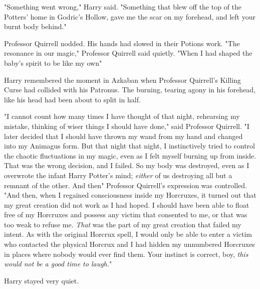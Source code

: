 "Something went wrong," Harry said. "Something that blew off the top of the
Potters' home in Godric's Hollow, gave me the scar on my forehead, and left
your burnt body behind."

Professor Quirrell nodded. His hands had slowed in their Potions work. "The
resonance in our magic," Professor Quirrell said quietly. "When I had shaped
the baby's spirit to be like my own{\el}"

Harry remembered the moment in Azkaban when Professor Quirrell's Killing Curse
had collided with his Patronus. The burning, tearing agony in his forehead,
like his head had been about to split in half.

"I cannot count how many times I have thought of that night, rehearsing my
mistake, thinking of wiser things I should have done," said Professor Quirrell.
"I later decided that I should have thrown my wand from my hand and changed
into my Animagus form. But that night{\el} that night, I instinctively tried
to control the chaotic fluctuations in my magic, even as I felt myself burning
up from inside. That was the wrong decision, and I failed. So my body was
destroyed, even as I overwrote the infant Harry Potter's mind; \emph{either} of
us destroying all but a remnant of the other. And then{\el}" Professor
Quirrell's expression was controlled. "And then, when I regained consciousness
inside my Horcruxes, it turned out that my great creation did not work as I had
hoped. I should have been able to float free of my Horcruxes and possess any
victim that consented to me, or that was too weak to refuse me. \emph{That} was
the part of my great creation that failed my intent. As with the original
Horcrux spell, I would only be able to enter a victim who contacted the
physical Horcrux{\el} and I had hidden my unnumbered Horcruxes in places
where nobody would ever find them. Your instinct is correct, boy, \emph{this
would not be a good time to laugh.}"

Harry stayed very quiet.

